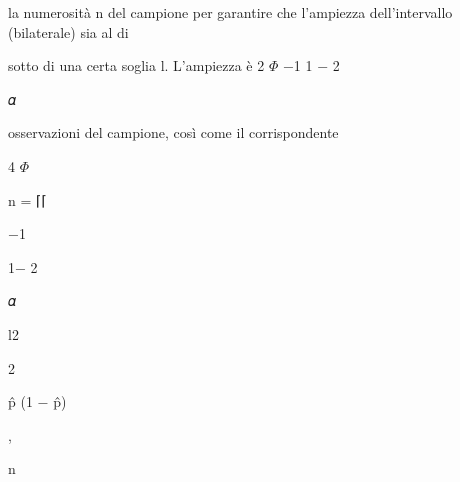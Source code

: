 \documentclass[a4paper,portrait,12pt]{article}
\begin{document}
\begin{flushleft}
la numerosit\`{a} n del campione per garantire che l'ampiezza dell'intervallo (bilaterale) sia al di
\end{flushleft}


\begin{flushleft}
sotto di una certa soglia l. L'ampiezza \`{e} 2 $\Phi$ $-$1 1 $-$ 2
\end{flushleft}





\begin{flushleft}
𝛼
\end{flushleft}





\begin{flushleft}
osservazioni del campione, così come il corrispondente
\end{flushleft}


\begin{flushleft}
4 $\Phi$
\end{flushleft}


\begin{flushleft}
n = ⌈⌈
\end{flushleft}





$-$1





1$-$ 2





\begin{flushleft}
𝛼
\end{flushleft}





\begin{flushleft}
l2
\end{flushleft}





2





\begin{flushleft}
p̂ (1 $-$ p̂)
\end{flushleft}


,


\begin{flushleft}
n
\end{flushleft}
\end{document}
